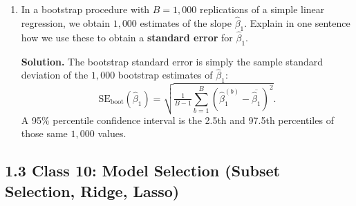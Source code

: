 \documentclass[11pt]{article}
\newcommand{\solution}[1]{%
  \par\medskip\noindent\textbf{Solution.} #1\par\medskip
}
\begin{document}
\begin{enumerate}[leftmargin=*, resume]
\item In a bootstrap procedure with $B = 1{,}000$ replications of a simple linear regression, we obtain $1{,}000$ estimates of the slope $\hat\beta_1$. Explain in one sentence how we use these to obtain a \textbf{standard error} for $\hat\beta_1$.

\solution{The bootstrap standard error is simply the sample standard deviation of the $1{,}000$ bootstrap estimates of $\hat\beta_1$:
$$\text{SE}_{\text{boot}}(\hat\beta_1) = \sqrt{\tfrac{1}{B-1}\sum_{b=1}^{B}\left(\hat\beta_1^{(b)} - \overline{\hat\beta_1}\right)^2}.$$
A 95\% percentile confidence interval is the 2.5th and 97.5th percentiles of those same $1{,}000$ values.}

\end{enumerate}


\subsection*{1.3 Class 10: Model Selection (Subset Selection, Ridge, Lasso)}
\end{document}
